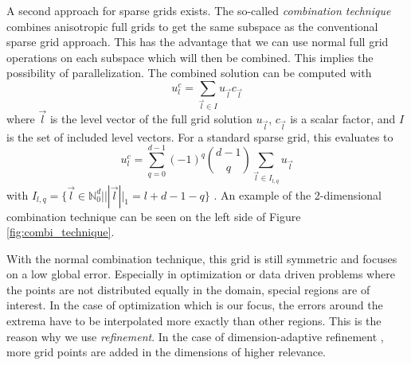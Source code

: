 A second approach for sparse grids exists. The so-called \textit{combination technique} \cite{griebel1990combination} combines anisotropic full grids to get the same subspace as the conventional sparse grid approach. This has the advantage that we can use normal full grid operations on each subspace which will then be combined. This implies the possibility of parallelization. The combined solution can be computed with 
\begin{equation}
	u_l^c = \sum_{ \vec{l} \in I } u_{\vec{l}} c_{\vec{l}}
\end{equation}
where $ \vec{l} $ is the level vector of the full grid solution $ u_{\vec{l}} $, $ c_{\vec{l}} $ is a scalar factor, and $ I $ is the set of included level vectors. For a standard sparse grid, this evaluates to 
\begin{equation}
	u_l^c = \sum_{ q = 0 }^{d-1} (-1)^q \binom{d-1}{q} \sum_{\vec{l} \in I_{l,q} } u_{\vec{l}}
\end{equation}
with $ I_{l,q} = \{ \vec{l} \in \mathbb{N}_0^d | ||\vec{l}||_1 = l+d-1-q \} $ \cite{obersteiner2021generalized}. An example of the 2-dimensional combination technique can be seen on the left side of Figure \ref{fig:combi_technique}.

With the normal combination technique, this grid is still symmetric and focuses on a low global error. Especially in optimization or data driven problems where the points are not distributed equally in the domain, special regions are of interest. In the case of optimization which is our focus, the errors around the extrema have to be interpolated more exactly than other regions. This is the reason why we use \textit{refinement}. In the case of dimension-adaptive refinement \cite{hegland2002adaptive}, more grid points are added in the dimensions of higher relevance. 

